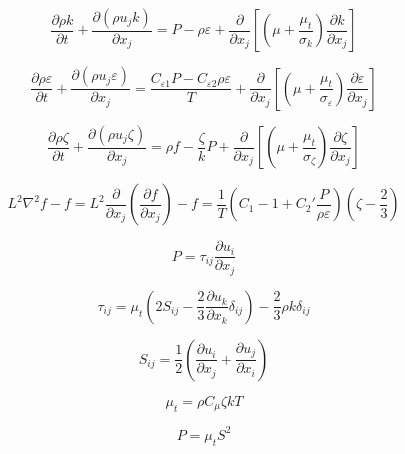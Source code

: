 

\begin{equation}
\frac{\partial \rho k}{\partial t} +
\frac{\partial (\rho u_j k)}{\partial x_j} = P - \rho \varepsilon +
\frac{\partial}{\partial x_j} \left[
\left( \mu + \frac{\mu_t}{\sigma_k} \right) \frac{\partial k}{\partial x_j} \right]
\end{equation}

\begin{equation}
\frac{\partial \rho \varepsilon}{\partial t} +
\frac{\partial (\rho u_j \varepsilon)}{\partial x_j} = 
\frac{C_{\varepsilon 1} P - C_{\varepsilon 2} \rho \varepsilon}{T}
+ \frac{\partial}{\partial x_j} \left[
\left( \mu + \frac{\mu_t}{\sigma_{\varepsilon}} \right) \frac{\partial \varepsilon}{\partial x_j} \right]
\end{equation}

\begin{equation}
\frac{\partial \rho \zeta}{\partial t} +
\frac{\partial (\rho u_j \zeta)}{\partial x_j} = \rho f - \frac{\zeta}{k}P +
\frac{\partial}{\partial x_j} \left[
\left( \mu + \frac{\mu_t}{\sigma_{\zeta}} \right) \frac{\partial \zeta}{\partial x_j} \right]
\end{equation}

\begin{equation}
L^2\nabla^2 f - f = L^2\frac{\partial}{\partial x_j}\left(\frac{\partial f}{\partial x_j}\right) -f = 
\frac{1}{T} \left(C_1 - 1 + C_2' \frac{P}{\rho \varepsilon} \right) 
\left(\zeta - \frac{2}{3} \right)
\end{equation}

\begin{equation}
P = \tau_{ij} \frac{\partial u_i}{\partial x_j}
\end{equation}

\begin{equation}
\tau_{ij} = \mu_t \left(2S_{ij} - \frac{2}{3} \frac{\partial u_k}{\partial x_k} \delta_{ij} \right)
   - \frac{2}{3} \rho k \delta_{ij}
\end{equation}

\begin{equation}
S_{ij} = \frac{1}{2} \left( \frac{\partial u_i}{\partial x_j} + \frac{\partial u_j}{\partial x_i} \right)
\end{equation}

\begin{equation}
\mu_t = \rho C_{\mu} \zeta k T
\end{equation}

\begin{equation}
P = \mu_t S^2
\end{equation}

